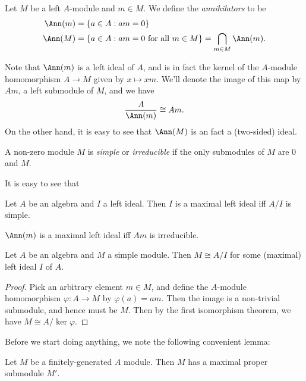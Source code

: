 \documentclass[a4paper]{article}
\begin{document}
\begin{defi}[Annihilator]
  Let $M$ be a left $A$-module and $m \in M$. We define the \emph{annihilators} to be
  \begin{align*}
    \Ann(m) &= \{a \in A: am = 0\}\\
    \Ann(M) &= \{a \in A: am = 0\text{ for all }m \in M\} = \bigcap_{m \in M} \Ann(m).
  \end{align*}
\end{defi}
Note that $\Ann(m)$ is a left ideal of $A$, and is in fact the kernel of the $A$-module homomorphism $A \to M$ given by $x \mapsto xm$. We'll denote the image of this map by $Am$, a left submodule of $M$, and we have
\[
  \frac{A}{\Ann(m)} \cong Am.
\]
On the other hand, it is easy to see that $\Ann(M)$ is an fact a (two-sided) ideal.

\begin{defi}
  A non-zero module $M$ is \emph{simple} or \emph{irreducible} if the only submodules of $M$ are $0$ and $M$.
\end{defi}

It is easy to see that
\begin{prop}
  Let $A$ be an algebra and $I$ a left ideal. Then $I$ is a maximal left ideal iff $A/I$ is simple.
\end{prop}

\begin{eg}
  $\Ann(m)$ is a maximal left ideal iff $Am$ is irreducible.
\end{eg}

\begin{prop}
  Let $A$ be an algebra and $M$ a simple module. Then $M \cong A/I$ for some (maximal) left ideal $I$ of $A$.
\end{prop}

\begin{proof}
  Pick an arbitrary element $m \in M$, and define the $A$-module homomorphism $\varphi: A \to M$ by $\varphi(a) = am$. Then the image is a non-trivial submodule, and hence must be $M$. Then by the first isomorphism theorem, we have $M \cong A/\ker \varphi$.
\end{proof}

Before we start doing anything, we note the following convenient lemma:
\begin{lemma}
  Let $M$ be a finitely-generated $A$ module. Then $M$ has a maximal proper submodule $M'$.
\end{lemma}
\end{document}
